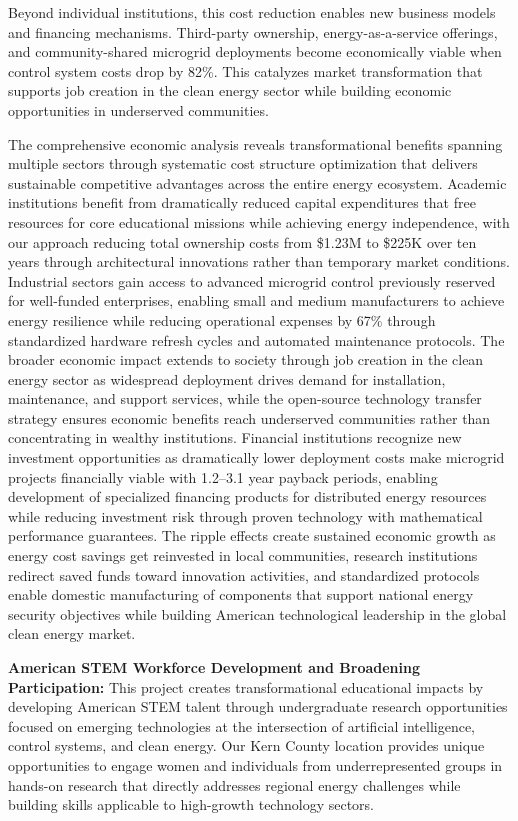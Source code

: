 \documentclass[12pt]{article}
\begin{document}
Beyond individual institutions, this cost reduction enables new business models and financing mechanisms. Third-party ownership, energy-as-a-service offerings, and community-shared microgrid deployments become economically viable when control system costs drop by 82\%. This catalyzes market transformation that supports job creation in the clean energy sector while building economic opportunities in underserved communities.

The comprehensive economic analysis reveals transformational benefits spanning multiple sectors through systematic cost structure optimization that delivers sustainable competitive advantages across the entire energy ecosystem. Academic institutions benefit from dramatically reduced capital expenditures that free resources for core educational missions while achieving energy independence, with our approach reducing total ownership costs from \$1.23M to \$225K over ten years through architectural innovations rather than temporary market conditions. Industrial sectors gain access to advanced microgrid control previously reserved for well-funded enterprises, enabling small and medium manufacturers to achieve energy resilience while reducing operational expenses by 67\% through standardized hardware refresh cycles and automated maintenance protocols. The broader economic impact extends to society through job creation in the clean energy sector as widespread deployment drives demand for installation, maintenance, and support services, while the open-source technology transfer strategy ensures economic benefits reach underserved communities rather than concentrating in wealthy institutions. Financial institutions recognize new investment opportunities as dramatically lower deployment costs make microgrid projects financially viable with 1.2--3.1 year payback periods, enabling development of specialized financing products for distributed energy resources while reducing investment risk through proven technology with mathematical performance guarantees. The ripple effects create sustained economic growth as energy cost savings get reinvested in local communities, research institutions redirect saved funds toward innovation activities, and standardized protocols enable domestic manufacturing of components that support national energy security objectives while building American technological leadership in the global clean energy market.

\textbf{American STEM Workforce Development and Broadening Participation:} This project creates transformational educational impacts by developing American STEM talent through undergraduate research opportunities focused on emerging technologies at the intersection of artificial intelligence, control systems, and clean energy. Our Kern County location provides unique opportunities to engage women and individuals from underrepresented groups in hands-on research that directly addresses regional energy challenges while building skills applicable to high-growth technology sectors.
\end{document}
